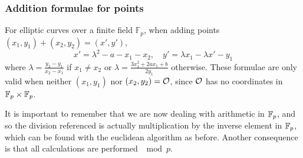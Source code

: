\subsubsection{Addition formulae for points}
For elliptic curves over a finite field $\mathbb{F}_p$, when adding points $(x_1,y_1) + (x_2,y_2) = (x',y')$,
$$x'=\lambda^2 - a - x_1 - x_2,\quad y' = \lambda x_1 -\lambda x' - y_1 $$
where $\lambda = \frac{y_2-y_1}{x_2-x_1}$ if $x_1\neq x_2$ or $\lambda=\frac{3x_1^2 + 2ax_1 + b}{2y_1}$ otherwise.
These formulae are only valid when neither $(x_1,y_1)$ nor $(x_2,y_2) = \mathcal{O}$, since $\mathcal{O}$ has no coordinates in $\mathbb{F}_{p} \times \mathbb{F}_{p}$.

It is important to remember that we are now dealing with arithmetic in $\mathbb{F}_{p}$, and so the division referenced is actually multiplication by the inverse element in $\mathbb{F}_{p}$, which can be found with the euclidean algorithm as before.
Another consequence is that all calculations are performed $\mod p$.
